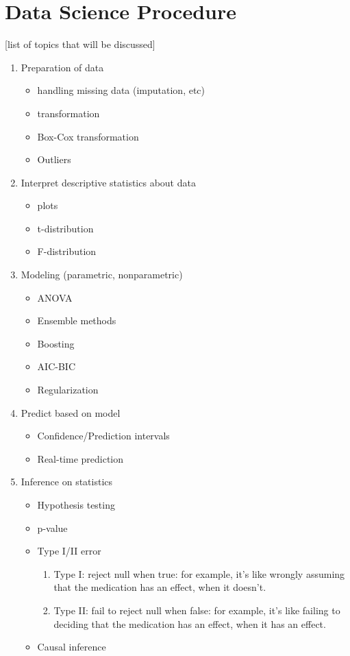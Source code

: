 \documentclass[11pt,reqno]{amsart}
\theoremstyle{remark}
\begin{document}
\section{Data Science Procedure}[list of topics that will be discussed]
\begin{enumerate}
\item Preparation of data
\begin{itemize}
\item handling missing data (imputation, etc)
\item transformation
\item Box-Cox transformation
\item Outliers
\end{itemize}

\item Interpret descriptive statistics about data
\begin{itemize}
\item plots
\item t-distribution
\item F-distribution
\end{itemize}

\item Modeling (parametric, nonparametric)
\begin{itemize}
\item ANOVA
\item Ensemble methods
\item Boosting
\item AIC-BIC
\item Regularization
\end{itemize}

\item Predict based on model
\begin{itemize}
\item Confidence/Prediction intervals
\item Real-time prediction
\end{itemize}

\item Inference on statistics
\begin{itemize}
\item Hypothesis testing
\item p-value
\item Type I/II error
\begin{enumerate}
\item Type I: reject null when true: for example, it's like wrongly assuming that the medication has an effect, when it doesn't.
\item Type II: fail to reject null when false: for example, it's like failing to deciding that the medication has an effect, when it has an effect. 
\end{enumerate}
\item Causal inference
\end{itemize}


\end{enumerate}
\end{document}
